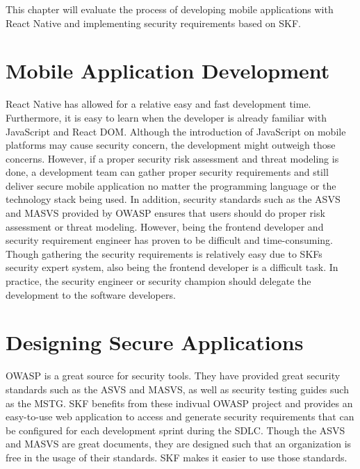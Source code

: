 This chapter will evaluate the process of developing mobile applications with React Native and implementing security requirements based on SKF.

\section{Mobile Application Development}
React Native has allowed for a relative easy and fast development time. Furthermore, it is easy to learn when the developer is already familiar with JavaScript and React DOM. Although the introduction of JavaScript on mobile platforms may cause security concern, the development might outweigh those concerns. However, if a proper security risk assessment and threat modeling is done, a development team can gather proper security requirements and still deliver secure mobile application no matter the programming language or the technology stack being used. In addition, security standards such as the ASVS and MASVS provided by OWASP ensures that users should do proper risk assessment or threat modeling. However, being the frontend developer and security requirement engineer has proven to be difficult and time-consuming. Though gathering the security requirements is relatively easy due to SKFs security expert system, also being the frontend developer is a difficult task. In practice, the security engineer or security champion should delegate the development to the software developers.

\section{Designing Secure Applications}
OWASP is a great source for security tools. They have provided great security standards such as the ASVS and MASVS, as well as security testing guides such as the MSTG. SKF benefits from these indivual OWASP project and provides an easy-to-use web application to access and generate security requirements that can be configured for each development sprint during the SDLC. Though the ASVS and MASVS are great documents, they are designed such that an organization is free in the usage of their standards. SKF makes it easier to use those standards.
